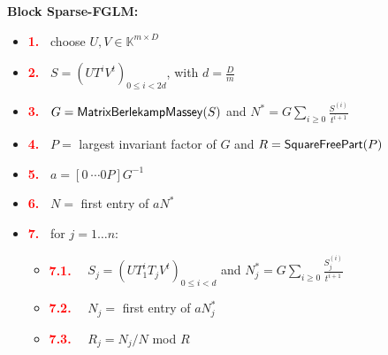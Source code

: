 \documentclass[12pt]{article}
\begin{document}
\begin{center}
	\textbf{Block Sparse-FGLM:}
	\begin{itemize}
		\item[]\textcolor{red}{\bf 1.~} {\sf choose $U,V \in \mathbb{K}^{m \times D}$}
		\item[]\textcolor{red}{\bf 2.~} {\sf $S= (UT^iV^t)_{0 \le i < 2d}$, with $d = \frac{D}{m}$}
		\item[]\textcolor{red}{\bf 3.~} {\sf $G = {\sf MatrixBerlekampMassey}(S)$ and $N^* = G\sum_{i\ge 0} \frac{S^{(i)}}{t^{i+1}}$}
		\item[]\textcolor{red}{\bf 4.~} {\sf $P=$ largest invariant factor of $G$ and $R={\sf SquareFreePart}(P)$}
		\item[]\textcolor{red}{\bf 5.~} {\sf $a = [0 ~\cdots 0 P] G^{-1}$}
		\item[]\textcolor{red}{\bf 6.~} {\sf $N=$ first entry of $aN^*$}
		\item[]\textcolor{red}{\bf 7.~} {\sf for $j = 1 \dots n$:}
		\begin{itemize}
			\item[]\textcolor{red}{\bf 7.1.} ~~{\sf $S_j = (UT_1^i T_j V^t)_{0 \le i < d}$ and $N_j^* = G\sum_{i\ge 0} \frac{S_j^{(i)}}{t^{i+1}}$}
			\item[]\textcolor{red}{\bf 7.2.} ~~{\sf $N_j=$ first entry of $aN_j^*$}
			\item[]\textcolor{red}{\bf 7.3.} ~~{\sf $R_j=N_j/N$ mod $R$}
		\end{itemize}
	\end{itemize}
\end{center}
\end{document}

